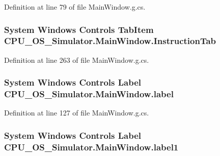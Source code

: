 Definition at line 79 of file Main\+Window.\+g.\+cs.

\hypertarget{class_c_p_u___o_s___simulator_1_1_main_window_a4fe9f6d97eb1f2c45b9e5a0363e61557}{}
\subsubsection[{Instruction\+Tab}]{\setlength{\rightskip}{0pt plus 5cm}System Windows Controls Tab\+Item C\+P\+U\+\_\+\+O\+S\+\_\+\+Simulator.\+Main\+Window.\+Instruction\+Tab\hspace{0.3cm}{\ttfamily [package]}}\label{class_c_p_u___o_s___simulator_1_1_main_window_a4fe9f6d97eb1f2c45b9e5a0363e61557}


Definition at line 263 of file Main\+Window.\+g.\+cs.

\hypertarget{class_c_p_u___o_s___simulator_1_1_main_window_ad60038602dcf5d954e420bee89c8494d}{}
\subsubsection[{label}]{\setlength{\rightskip}{0pt plus 5cm}System Windows Controls Label C\+P\+U\+\_\+\+O\+S\+\_\+\+Simulator.\+Main\+Window.\+label\hspace{0.3cm}{\ttfamily [package]}}\label{class_c_p_u___o_s___simulator_1_1_main_window_ad60038602dcf5d954e420bee89c8494d}


Definition at line 127 of file Main\+Window.\+g.\+cs.

\hypertarget{class_c_p_u___o_s___simulator_1_1_main_window_a09b3ba374a620331bc447b32959260c2}{}
\subsubsection[{label1}]{\setlength{\rightskip}{0pt plus 5cm}System Windows Controls Label C\+P\+U\+\_\+\+O\+S\+\_\+\+Simulator.\+Main\+Window.\+label1\hspace{0.3cm}{\ttfamily [package]}}\label{class_c_p_u___o_s___simulator_1_1_main_window_a09b3ba374a620331bc447b32959260c2}


